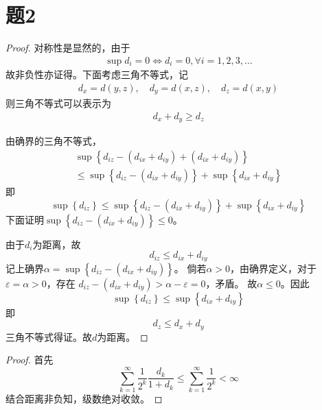 \documentclass[cn]{homework}
\begin{document}
    \section{题2}
    \begin{subproblem}
        \item
        \begin{proof}
        对称性是显然的，由于
        \begin{align*}
            \sup d_i=0\Leftrightarrow d_i=0,\forall i=1,2,3,\dots
        \end{align*}
        故非负性亦证得。下面考虑三角不等式，记
        \begin{align*}
            d_x=d(y,z),\quad d_y=d(x,z),\quad d_z=d(x,y)
        \end{align*}
        则三角不等式可以表示为
        \begin{align*}
            d_x+d_y\geq d_z
        \end{align*}

        由确界的三角不等式，
        \begin{multline*}
            \sup\left\{d_{iz}-\left(d_{ix}+d_{iy}\right)+\left(d_{ix}+d_{iy}\right)\right\}\\
            \leq\sup\left\{d_{iz}-\left(d_{ix}+d_{iy}\right)\right\}
            +\sup\left\{d_{ix}+d_{iy}\right\}
        \end{multline*}
        即
        \[
            \sup\left\{d_{iz}\right\}
            \leq\sup\left\{d_{iz}-\left(d_{ix}+d_{iy}\right)\right\}
            +\sup\left\{d_{ix}+d_{iy}\right\}
        \]
        下面证明$\sup\left\{d_{iz}-\left(d_{ix}+d_{iy}\right)\right\}\leq 0$。

        由于$d_i$为距离，故
        \[d_{iz}\leq d_{ix}+d_{iy}\]
        记上确界$\alpha=\sup\left\{d_{iz}-\left(d_{ix}+d_{iy}\right)\right\}$。
        倘若$\alpha>0$，由确界定义，对于$\varepsilon=\alpha>0$，存在
        $d_{iz}-\left(d_{ix}+d_{iy}\right)>\alpha-\varepsilon=0$，矛盾。
        故$\alpha\leq 0$。因此
        \[\sup\left\{d_{iz}\right\}\leq\sup\left\{d_{ix}+d_{iy}\right\}\]
        即
        \[d_z\leq d_x+d_y\]
        三角不等式得证。故$d$为距离。
        \end{proof}

        \item
        \begin{proof}
        首先
        \[\sum_{k=1}^\infty\frac{1}{2^k}\frac{d_k}{1+d_k}
        \leq\sum_{k=1}^\infty\frac{1}{2^k}<\infty\]
        结合距离非负知，级数绝对收敛。


\end{proof}
\end{subproblem}
\end{document}
